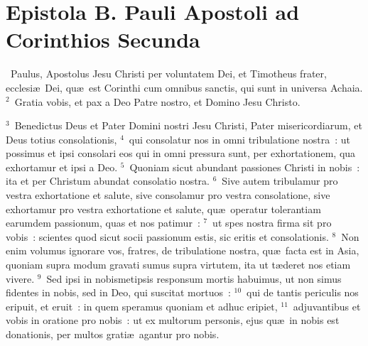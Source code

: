 {\centering \section*{Epistola B. Pauli Apostoli ad Corinthios Secunda}}\thispagestyle{empty}

~Paulus, Apostolus Jesu Christi per voluntatem Dei, et Timotheus frater, ecclesi\ae\ Dei, qu\ae\ est Corinthi cum omnibus sanctis, qui sunt in universa Achaia.
${}^{2}$~Gratia vobis, et pax a Deo Patre nostro, et Domino Jesu Christo.


${}^{3}$~Benedictus Deus et Pater Domini nostri Jesu Christi, Pater misericordiarum, et Deus totius consolationis,
${}^{4}$~qui consolatur nos in omni tribulatione nostra~: ut possimus et ipsi consolari eos qui in omni pressura sunt, per exhortationem, qua exhortamur et ipsi a Deo.
${}^{5}$~Quoniam sicut abundant passiones Christi in nobis~: ita et per Christum abundat consolatio nostra.
${}^{6}$~Sive autem tribulamur pro vestra exhortatione et salute, sive consolamur pro vestra consolatione, sive exhortamur pro vestra exhortatione et salute, qu\ae\ operatur tolerantiam earumdem passionum, quas et nos patimur~:
${}^{7}$~ut spes nostra firma sit pro vobis~: scientes quod sicut socii passionum estis, sic eritis et consolationis.
${}^{8}$~Non enim volumus ignorare vos, fratres, de tribulatione nostra, qu\ae\ facta est in Asia, quoniam supra modum gravati sumus supra virtutem, ita ut t\ae deret nos etiam vivere.
${}^{9}$~Sed ipsi in nobismetipsis responsum mortis habuimus, ut non simus fidentes in nobis, sed in Deo, qui suscitat mortuos~:
${}^{10}$~qui de tantis periculis nos eripuit, et eruit~: in quem speramus quoniam et adhuc eripiet,
${}^{11}$~adjuvantibus et vobis in oratione pro nobis~: ut ex multorum personis, ejus qu\ae\ in nobis est donationis, per multos grati\ae\ agantur pro nobis.


